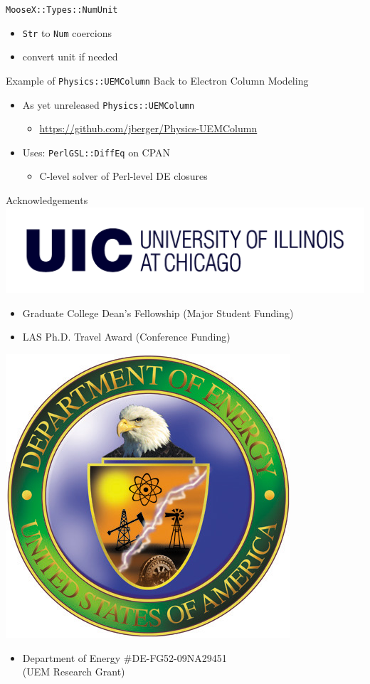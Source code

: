\documentclass[mathserif]{beamer}
\providecommand{\code}[1]{{\texttt{\scriptsize{#1}}}}
\begin{document}
\begin{frame}{\texttt{MooseX::Types::NumUnit}}
  \begin{itemize}
    \item \code{Str} to \code{Num} coercions
    \item convert unit if needed
  \end{itemize}
  \begin{block}{}
    \scriptsize
    
  \end{block}
\end{frame}

\begin{frame}{Example of \texttt{Physics::UEMColumn}}
  Back to Electron Column Modeling
  
  \begin{itemize}
    \item As yet unreleased \code{Physics::UEMColumn}
    \begin{itemize}
      \item \url{https://github.com/jberger/Physics-UEMColumn}
    \end{itemize}
    \item Uses: \code{PerlGSL::DiffEq} on CPAN
    \begin{itemize}
      \item C-level solver of Perl-level DE closures
    \end{itemize}
  \end{itemize}
\end{frame}

\begin{frame}{Acknowledgements}
  \includegraphics[width=0.7\linewidth]{uic}
  \begin{itemize}
    \item Graduate College Dean's Fellowship (Major Student Funding)
    \item LAS Ph.D. Travel Award (Conference Funding)
  \end{itemize}
  \includegraphics[width=0.15\linewidth]{doe}
  \begin{itemize}
    \item Department of Energy \#DE-FG52-09NA29451\\(UEM Research Grant)
  \end{itemize}
\end{frame}
\end{document}
